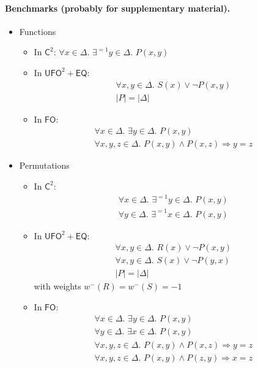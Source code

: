 \documentclass{article}
\theoremstyle{definition}
\newcommand{\Ctwo}{$\mathsf{C}^{2}$}
\newcommand{\FO}{$\mathsf{FO}$}
\newcommand{\UFO}{$\mathsf{UFO}^{2} + \mathsf{EQ}$}
\begin{document}
\paragraph{Benchmarks (probably for supplementary material).}
\begin{itemize}
  \item Functions
        \begin{itemize}
          \item In \Ctwo: $\forall x \in \Delta\text{.
                }\exists^{=1} y \in \Delta\text{. }P(x, y)$
          \item In \UFO:
                \begin{gather*}
                  \forall x, y \in \Delta\text{. }S(x) \lor \neg P(x, y)\\
                  |P| = |\Delta|
                \end{gather*}
          \item In \FO:
                \begin{gather*}
                  \forall x \in \Delta\text{. }\exists y \in \Delta\text{. }P(x, y)\\
                  \forall x, y, z \in \Delta\text{. }P(x, y) \land P(x, z) \Rightarrow y = z
                \end{gather*}
        \end{itemize}
  \item Permutations
        \begin{itemize}
          \item In \Ctwo:
                \begin{gather*}
                  \forall x \in \Delta\text{. }\exists^{=1} y \in \Delta\text{. }P(x, y)\\
                  \forall y \in \Delta\text{. }\exists^{=1} x \in \Delta\text{. }P(x, y)
                \end{gather*}
          \item In \UFO:
                \begin{gather*}
                  \forall x, y \in \Delta\text{. }R(x) \lor \neg P(x, y)\\
                  \forall x, y \in \Delta\text{. }S(x) \lor \neg P(y, x)\\
                  |P| = |\Delta|
                \end{gather*}
                with weights $w^{-}(R) = w^{-}(S) = -1$
          \item In \FO:
                \begin{gather*}
                  \forall x \in \Delta\text{. }\exists y \in \Delta\text{. }P(x, y)\\
                  \forall y \in \Delta\text{. }\exists x \in \Delta\text{. }P(x, y)\\
                  \forall x, y, z \in \Delta\text{. }P(x, y) \land P(x, z) \Rightarrow y = z\\
                  \forall x, y, z \in \Delta\text{. }P(x, y) \land P(z, y) \Rightarrow x = z
                \end{gather*}
        \end{itemize}
\end{itemize}
\end{document}
